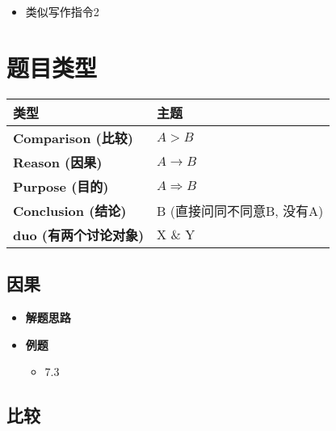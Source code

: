     \begin{itemize}
      \item 类似写作指令2
    \end{itemize}

\section{题目类型}

  \begin{tabu} to \columnwidth{| X[1, c] | X[1, c] |}
    \hline
    \textbf{类型} & \textbf{主题} \\ \hline
    \textbf{Comparison (比较)} & $ A > B $ \\ \hline
    \textbf{Reason (因果)} & $ A \rightarrow B $ \\ \hline
    \textbf{Purpose (目的)} & $ A \Rightarrow B $ \\ \hline
    \textbf{Conclusion (结论)} & B (直接问同不同意B, 没有A) \\ \hline
    \textbf{duo (有两个讨论对象)} & X \& Y \\ \hline
  \end{tabu}

  \subsection{因果}

    \begin{itemize}
      \item \textbf{解题思路}
      \item \textbf{例题}
      \begin{itemize}
        \item 7.3
      \end{itemize}
    \end{itemize}

  \subsection{比较}

